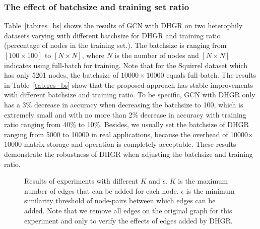 \documentclass[sigconf]{acmart}
\begin{document}
	\subsubsection{The effect of batchsize and training set ratio}
	Table~\ref{tab:res_bs} shows the results of GCN with DHGR on two heterophily datasets varying with different batchsize for DHGR and training ratio (percentage of nodes in the training set.). The batchsize is ranging from $[100\times 100]$ to $[N\times N]$, where $N$ is the number of nodes and $[N\times N]$ indicates using full-batch for training. Note that for the Squirrel dataset which has only 5201 nodes, the batchsize of $10000\times 10000$ equals full-batch. The results in Table~\ref{tab:res_bs} show that the proposed approach has stable improvements with different batchsize and training ratio. To be specific, GCN with DHGR only has a 3\% decrease in accuracy when decreasing the batchsize to 100, which is extremely small and with no more than 2\% decrease in accuracy with training ratio ranging from 40\% to 10\%. Besides, we usually set the batchsize of DHGR ranging from 5000 to 10000 in real applications, because the overhead of 10000$\times$10000 matrix storage and operation is completely acceptable. These results demonstrate the robustness of DHGR when adjusting the batchsize and training ratio.
	
	
	\begin{figure}[h]
		\begin{minipage}[t]{0.5\linewidth}
			\centering
\end{minipage}\begin{minipage}[t]{0.5\linewidth}
			\centering
		\end{minipage}
		\caption{Results of experiments with different $K$ and $\epsilon$. $K$ is the maximum number of edges that can be added for each node. $\epsilon$ is the minimum similarity threshold of node-pairs between which edges can be added. Note that we remove all edges on the original graph for this experiment and only to verify the effects of edges added by DHGR.}
		
		\label{fig:heat_k_epsilon}
	\end{figure}
\end{document}
